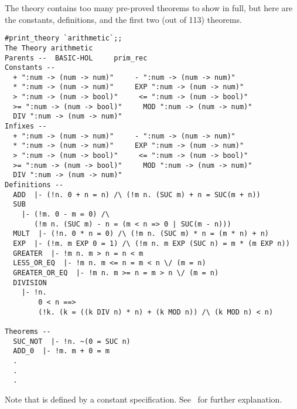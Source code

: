 The theory   contains  too many  pre-proved theorems  to show in
full, but  here are  the constants,  definitions, and  the first  two (out of
113) theorems.

\begin{session}\begin{verbatim}
#print_theory `arithmetic`;;
The Theory arithmetic
Parents --  BASIC-HOL     prim_rec
Constants --
  + ":num -> (num -> num)"     - ":num -> (num -> num)"
  * ":num -> (num -> num)"     EXP ":num -> (num -> num)"
  > ":num -> (num -> bool)"     <= ":num -> (num -> bool)"
  >= ":num -> (num -> bool)"     MOD ":num -> (num -> num)"
  DIV ":num -> (num -> num)"
Infixes --
  + ":num -> (num -> num)"     - ":num -> (num -> num)"
  * ":num -> (num -> num)"     EXP ":num -> (num -> num)"
  > ":num -> (num -> bool)"     <= ":num -> (num -> bool)"
  >= ":num -> (num -> bool)"     MOD ":num -> (num -> num)"
  DIV ":num -> (num -> num)"
Definitions --
  ADD  |- (!n. 0 + n = n) /\ (!m n. (SUC m) + n = SUC(m + n))
  SUB
    |- (!m. 0 - m = 0) /\
       (!m n. (SUC m) - n = (m < n => 0 | SUC(m - n)))
  MULT  |- (!n. 0 * n = 0) /\ (!m n. (SUC m) * n = (m * n) + n)
  EXP  |- (!m. m EXP 0 = 1) /\ (!m n. m EXP (SUC n) = m * (m EXP n))
  GREATER  |- !m n. m > n = n < m
  LESS_OR_EQ  |- !m n. m <= n = m < n \/ (m = n)
  GREATER_OR_EQ  |- !m n. m >= n = m > n \/ (m = n)
  DIVISION
    |- !n.
        0 < n ==>
        (!k. (k = ((k DIV n) * n) + (k MOD n)) /\ (k MOD n) < n)

Theorems --
  SUC_NOT  |- !n. ~(0 = SUC n)
  ADD_0  |- !m. m + 0 = m
  .
  .
  .
\end{verbatim}\end{session}

\noindent Note that  is defined by a constant specification. See
\DESCRIPTION\ for further explanation.
















